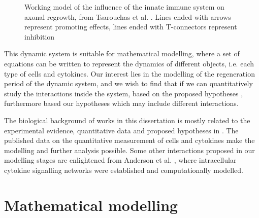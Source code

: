 \begin{figure}[t]
    \begin{center}
    \end{center}

    \caption[Working model of the influence of the innate immune system on axonal regrowth]%
    {Working model of the influence of the innate immune system on axonal regrowth, from Tsarouchas et al. \cite{ref:Tsarouchas}. Lines ended with arrows represent promoting effects, lines ended with T-connectors represent inhibition}
    \label{fig:map}

\end{figure}

This dynamic system is suitable for mathematical modelling, where a set of equations can be written to represent the dynamics of different objects, i.e. each type of cells and cytokines. Our interest lies in the modelling of the regeneration period of the dynamic system, and we wish to find that if we can quantitatively study the interactions inside the system, based on the proposed hypotheses \cite{ref:Tsarouchas},  furthermore based our hypotheses which may include different interactions.

The biological background of works in this dissertation is mostly related to the experimental evidence, quantitative data and proposed hypotheses in \cite{ref:Tsarouchas}. The published data on the quantitative measurement of cells and cytokines make the modelling and further analysis possible. Some other interactions proposed in our modelling stages are enlightened from Anderson et al. \cite{Anderson}, where intracellular cytokine signalling networks were established and computationally modelled.

\section{Mathematical modelling}


